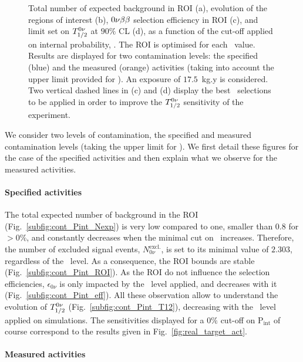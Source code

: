 \begin{figure}[!h]
\begin{subfigure}[t]{0.49\textwidth}
  \end{subfigure}
\caption{Total number of expected background in ROI (a),
  evolution of the regions of interest (b),
  $0\nu\beta\beta$ selection efficiency in ROI (c),
  and limit set on $T_{1/2}^{0\nu}$ at $90\%$ CL (d),
  as a function of the cut-off applied on internal probability, \Pint.
  The ROI is optimised for each \Pint\ value.
  Results are displayed for two contamination levels: the specified (blue) and the measured (orange) activities (taking into account the upper limit provided for \Bi).
  An exposure of $17.5$~kg.y is considered.
  Two vertical dashed lines in (c) and (d) display the best \Pint\ selections to be applied in order to improve the $T_{1/2}^{0\nu}$ sensitivity of the experiment.
  \label{fig:cont_Pint}}
\end{figure}
We consider two levels of contamination, the specified and measured contamination levels (taking the upper limit for \Bi).
We first detail these figures for the case of the specified activities and then explain what we observe for the measured activities.

\paragraph{Specified activities}
The total expected number of background in the ROI (Fig.~\ref{subfig:cont_Pint_Nexp}) is very low compared to one, smaller than $0.8$ for \Pint$>0$\%, and constantly decreases when the minimal cut on \Pint\ increases.
Therefore, the number of excluded signal events, $N_{0\nu}^{\text{excl.}}$, is set to its minimal value of $2.303$, regardless of the \Pint\ level.
As a consequence, the ROI bounds are stable (Fig.~\ref{subfig:cont_Pint_ROI}).
As the ROI do not influence the selection efficiencies, $\epsilon_{0\nu}$ is only impacted by the \Pint\ level applied, and decreases with it (Fig.~\ref{subfig:cont_Pint_eff}).
All these observation allow to understand the evolution of $T_{1/2}^{0\nu}$ (Fig.~\ref{subfig:cont_Pint_T12}), decreasing with the \Pint\ level applied on simulations.
The sensitivities displayed for a $0\%$ cut-off on P$_{\text{int}}$ of course correspond to the results given in Fig.~\ref{fig:real_target_act}.

\paragraph{Measured activities}

